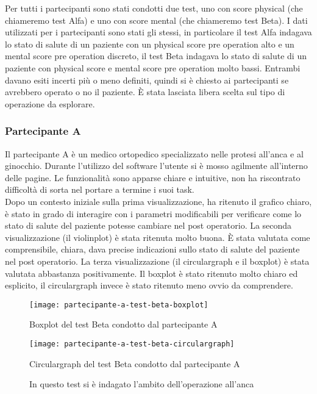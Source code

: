 Per tutti i partecipanti sono stati condotti due test, uno con score physical (che chiameremo test Alfa) e uno con score mental (che chiameremo test Beta).
I dati utilizzati per i partecipanti sono stati gli stessi, in particolare il test Alfa indagava lo stato di salute di un paziente con un physical score pre operation alto e un mental score pre operation discreto, il test Beta indagava lo stato di salute di un paziente con physical score e mental score pre operation molto bassi. Entrambi davano esiti incerti più o meno definiti, quindi si è chiesto ai partecipanti se avrebbero operato o no il paziente. È stata lasciata libera scelta sul tipo di operazione da esplorare. 

\subsubsection{Partecipante A}
Il partecipante A è un medico ortopedico specializzato nelle protesi all'anca e al ginocchio.
Durante l'utilizzo del software l'utente si è mosso agilmente all'interno delle pagine. Le funzionalità sono apparse chiare e intuitive, non ha riscontrato difficoltà di sorta nel portare a termine i suoi task. \\
Dopo un contesto iniziale sulla prima visualizzazione, ha ritenuto il grafico chiaro, è stato in grado di interagire con i parametri modificabili per verificare come lo stato di salute del paziente potesse cambiare nel post operatorio. La seconda visualizzazione (il violinplot) è stata ritenuta molto buona. È stata valutata come comprensibile, chiara, dava precise indicazioni sullo stato di salute del paziente nel post operatorio. La terza visualizzazione (il circulargraph e il boxplot) è stata valutata abbastanza positivamente. Il boxplot è stato ritenuto molto chiaro ed esplicito, il circulargraph invece è stato ritenuto meno ovvio da comprendere. \\ 

\begin{figure}[htbp]
    \centering
    \begin{minipage}{0.45\textwidth}
        \centering
        \texttt{[image: partecipante-a-test-beta-boxplot]}
        \caption{Boxplot del test Beta condotto dal partecipante A}
        \label{fig:boxplot-partecipante-a}
    \end{minipage}\hfill
    \begin{minipage}{0.45\textwidth}
        \centering
        \texttt{[image: partecipante-a-test-beta-circulargraph]}
        \caption{Circulargraph del test Beta condotto dal partecipante A}
        \label{fig:circulargraph-partecipante-a}
    \end{minipage}
    \caption*{In questo test si è indagato l'ambito dell'operazione all'anca}
\end{figure}

